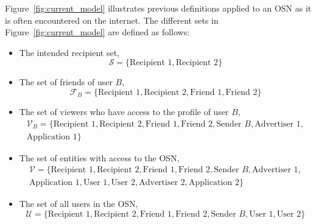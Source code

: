 Figure~\ref{fig:current_model} illustrates previous definitions applied to an OSN as it is often encountered on the internet. The different sets in Figure~\ref{fig:current_model} are defined as follows:
\begin{itemize}
 \item The intended recipient set,
 \begin{equation*}
  \mathcal{S} = \{ \textrm{Recipient 1}, \textrm{Recipient 2} \}
 \end{equation*}
 \item The set of friends of user $B$,
 \begin{equation*}
  \mathcal{F}_B = \{ \textrm{Recipient 1}, \textrm{Recipient 2}, \textrm{Friend 1}, \textrm{Friend 2} \}
 \end{equation*}
 \item The set of viewers who have access to the profile of user $B$,
 \begin{equation*}
  \begin{split}
   \mathcal{V}_B = \{ \textrm{Recipient 1}, \textrm{Recipient 2}, \textrm{Friend 1}, \textrm{Friend 2}, \textrm{Sender } B, \textrm{Advertiser 1}, \\
   \textrm{Application 1} \}
  \end{split}
 \end{equation*}
 \item The set of entities with access to the OSN,
\begin{equation*}
\begin{split}
 \mathcal{V} = \{ \textrm{Recipient 1}, \textrm{Recipient 2}, \textrm{Friend 1}, \textrm{Friend 2}, \textrm{Sender } B, \textrm{Advertiser 1},\\
  \textrm{Application 1}, \textrm{User 1}, \textrm{User 2}, \textrm{Advertiser 2}, \textrm{Application 2} \}
\end{split}
\end{equation*}
\item The set of all users in the OSN,
\begin{equation*}
 \mathcal{U} = \{ \textrm{Recipient 1}, \textrm{Recipient 2}, \textrm{Friend 1}, \textrm{Friend 2}, \textrm{Sender } B, \textrm{User 1}, \textrm{User 2}\}
\end{equation*}
\end{itemize}


